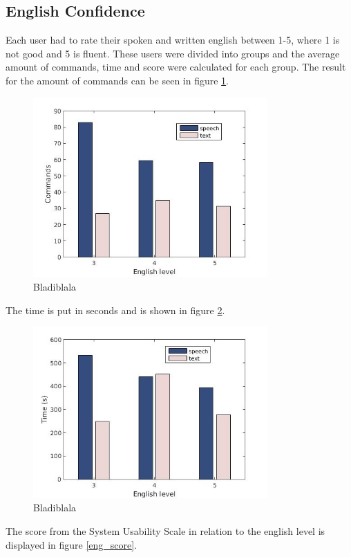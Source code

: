 \subsection{English Confidence} \label{sec:eng_con}
Each user had to rate their spoken and written english between 1-5, where 1 is not good and 5 is fluent. These users were divided into groups and the average amount of commands, time and score were calculated for each group. The result for the amount of commands can be seen in figure \ref{eng_cmd}. 
\begin{figure}[p]
  \centering
  \includegraphics[width=0.8\textwidth]{images/english_cmd.jpg}
  \caption{Bladiblala}\label{eng_cmd}
\end{figure}
The time is put in seconds and is shown in figure \ref{eng_time}.
\begin{figure}[p]
  \centering
  \includegraphics[width=0.8\textwidth]{images/english_time.jpg}
  \caption{Bladiblala}\label{eng_time}
\end{figure}
The score from the System Usability Scale in relation to the english level is displayed in figure \ref{eng_score}.
